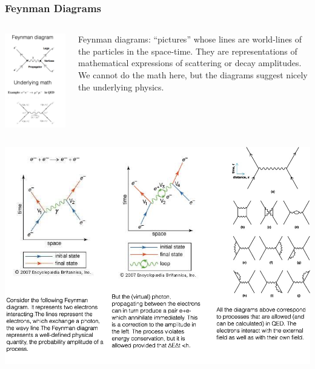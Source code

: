 \begin{frame}
\frametitle{Feynman Diagrams}
\begin{columns}
\includegraphics[scale=0.3]{img/FeynmanD2.png}
 
Feynman diagrams: ``pictures'' whose lines are world-lines of the particles in the space-time. They are representations of mathematical expressions of scattering or decay amplitudes. We cannot do the math here, but the diagrams suggest nicely the underlying physics. 

\end{columns}
\end{frame}
\begin{frame}
\includegraphics[scale=0.3]{img/FeynmanD3.png}

\end{frame}